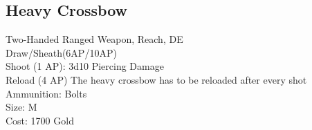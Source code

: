 \subsection{Heavy Crossbow}\label{weapon:heavyCrossbow}
Two-Handed Ranged Weapon,  Reach, DE\\
Draw/Sheath(6AP/10AP)\\
Shoot (1 AP): 3d10 Piercing Damage\\
Reload (4 AP) The heavy crossbow has to be reloaded after every shot\\
Ammunition: Bolts\\
Size: M\\
Cost: 1700 Gold\\